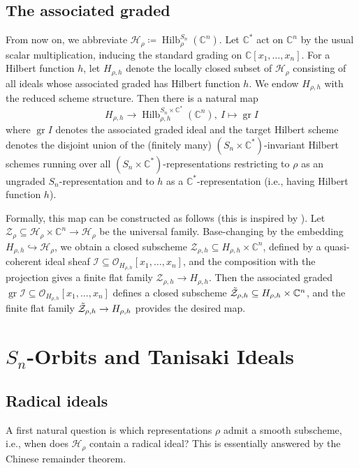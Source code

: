 \documentclass[11pt]{amsart}
\theoremstyle{definition}
\newcommand{\CC}{\mathbb{C}}
\newcommand{\HH}{\mathcal{H}}
\DeclareMathOperator{\Hilb}{Hilb}
\DeclareMathOperator{\gr}{gr}
\begin{document}
\subsection{The associated graded}\label{subsec:assocGraded}
From now on, we abbreviate $\HH_\rho \coloneqq \Hilb^{S_n}_\rho(\CC^n)$.
Let $\CC^\ast$ act on $\CC^n$ by the usual scalar multiplication, inducing the standard grading on $\CC[x_1,\ldots,x_n]$. For a Hilbert function $h$, let $H_{\rho,h}$ denote the locally closed subset of $\HH_\rho$ consisting of all ideals whose associated graded has Hilbert function $h$. We endow $H_{\rho,h}$ with the reduced scheme structure. Then there is a natural map
\begin{equation*}
H_{\rho,h} \longrightarrow \Hilb^{S_n \times \CC^\ast}_{\rho,h}(\CC^n), \ I \mapsto \gr I    
\end{equation*}
where $\gr I$ denotes the associated graded ideal and the target Hilbert scheme denotes the disjoint union of the (finitely many) $(S_n \times \CC^\ast)$-invariant Hilbert schemes running over all $(S_n \times \CC^\ast)$-representations restricting to $\rho$ as an ungraded $S_n$-representation and to $h$ as a $\CC^\ast$-representation (i.e., having Hilbert function $h$).

Formally, this map can be constructed as follows (this is inspired by \cite[Section~4.1]{Cartwright2009HilbertSchemeOf8Points}). Let $\mathcal{Z}_\rho \subseteq \HH_\rho \times \CC^n \rightarrow \HH_\rho$ be the universal family. Base-changing by the embedding $H_{\rho,h} \hookrightarrow \HH_\rho$, we obtain a closed subscheme $\mathcal{Z}_{\rho,h} \subseteq H_{\rho,h} \times \CC^n$, defined by a quasi-coherent ideal sheaf $\mathcal{I} \subseteq \mathcal{O}_{H_{\rho,h}}[x_1,\ldots,x_n]$, and the composition with the projection gives a finite flat family $\mathcal{Z}_{\rho,h} \rightarrow H_{\rho,h}$. Then the associated graded $\gr \mathcal{I} \subseteq \mathcal{O}_{H_{\rho,h}}[x_1,\ldots,x_n]$ defines a closed subscheme $\Tilde{\mathcal{Z}}_{\rho,h} \subseteq H_{\rho,h} \times \CC^n$, and the finite flat family $\Tilde{\mathcal{Z}}_{\rho,h} \rightarrow H_{\rho,h}$ provides the desired map.


\section{$S_n$-Orbits and Tanisaki Ideals}\label{section:Tanisaki}

\subsection{Radical ideals} A first natural question is which representations $\rho$ admit a smooth subscheme, i.e., when does $\mathcal{H}_\rho$ contain a radical ideal? This is essentially answered by the Chinese remainder theorem.
\end{document}
